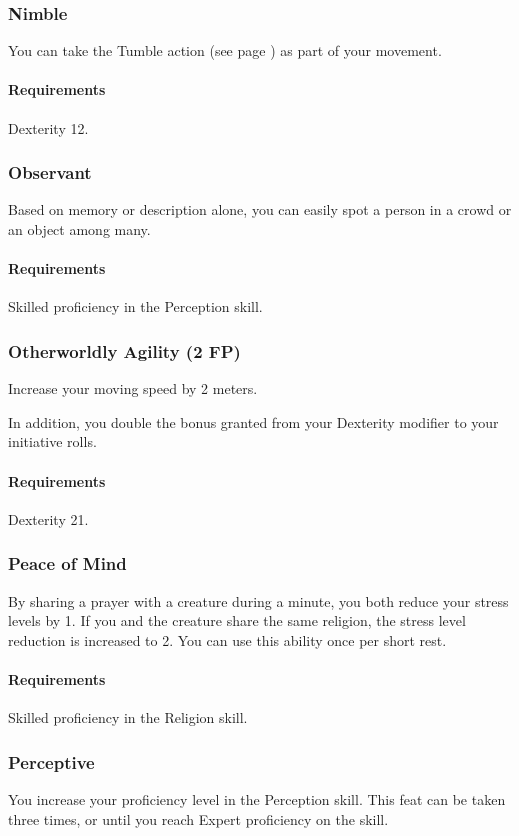 \subsubsection{Nimble} \label{feat::nimble}
    You can take the Tumble action (see page \pageref{act::tumble}) as part of your movement.
    \paragraph{Requirements} Dexterity 12.
\subsubsection{Observant} \label{feat::observant}
    Based on memory or description alone, you can easily spot a person in a crowd or an object among many.
    \paragraph{Requirements} Skilled proficiency in the Perception skill.
\subsubsection{Otherworldly Agility (2 FP)} \label{feat::otherwordlyagility}
    Increase your moving speed by 2 meters.

    In addition, you double the bonus granted from your Dexterity modifier to your initiative rolls.
    \paragraph{Requirements} Dexterity 21.
\subsubsection{Peace of Mind} \label{feat::peaceofmind}
    By sharing a prayer with a creature during a minute, you both reduce your stress levels by 1.
    If you and the creature share the same religion, the stress level reduction is increased to 2.
    You can use this ability once per short rest.
    \paragraph{Requirements} Skilled proficiency in the Religion skill.
\subsubsection{Perceptive} \label{feat::perceptive}
    You increase your proficiency level in the Perception skill.
    This feat can be taken three times, or until you reach Expert proficiency on the skill.

